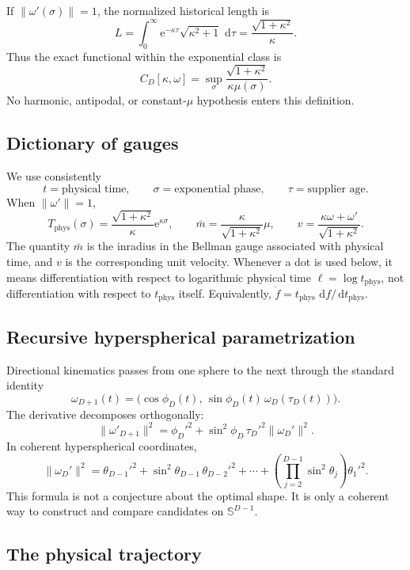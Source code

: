 \documentclass[10pt,a4paper]{article}
\newcommand{\Sph}{\mathbb{S}}
\newcommand{\dd}{\,\mathrm{d}}
\newcommand{\e}{\mathrm{e}}
\newcommand{\Tphys}{T_{\mathrm{phys}}}
\theoremstyle{plain}
\theoremstyle{definition}
\theoremstyle{remark}
\begin{document}
If $\|\omega'(\sigma)\|=1$, the normalized historical length is
\[
  L=\int_0^\infty \e^{-\kappa\tau}\sqrt{\kappa^2+1}\,\dd\tau
  =\frac{\sqrt{1+\kappa^2}}{\kappa}.
\]
Thus the exact functional within the exponential class is
\[
  C_D[\kappa,\omega]
  =\sup_\sigma\frac{\sqrt{1+\kappa^2}}{\kappa\mu(\sigma)}.
\]
No harmonic, antipodal, or constant-$\mu$ hypothesis enters this definition.

\subsection{Dictionary of gauges}

We use consistently
\[
  t=\text{physical time},
  \qquad
  \sigma=\text{exponential phase},
  \qquad
  \tau=\text{supplier age}.
\]
When $\|\omega'\|=1$,
\[
  \Tphys(\sigma)=\frac{\sqrt{1+\kappa^2}}{\kappa}\e^{\kappa\sigma},
  \qquad
  \bar m=\frac{\kappa}{\sqrt{1+\kappa^2}}\mu,
  \qquad
  v=\frac{\kappa\omega+\omega'}{\sqrt{1+\kappa^2}}.
\]
The quantity $\bar m$ is the inradius in the Bellman gauge associated with physical time, and $v$ is the corresponding unit velocity. Whenever a dot is used below, it means differentiation with respect to logarithmic physical time $\ell=\log t_{\mathrm{phys}}$, not differentiation with respect to $t_{\mathrm{phys}}$ itself. Equivalently, $\dot f=t_{\mathrm{phys}}\,\dd f/\dd t_{\mathrm{phys}}$.

\subsection{Recursive hyperspherical parametrization}

Directional kinematics passes from one sphere to the next through the standard identity
\[
  \omega_{D+1}(t)
  =\bigl(\cos\phi_D(t),\,\sin\phi_D(t)\,\omega_D(\tau_D(t))\bigr).
\]
The derivative decomposes orthogonally:
\[
  \|\omega'_{D+1}\|^2
  =\phi_D'^2+\sin^2\phi_D\,\tau_D'^2\|\omega_D'\|^2.
\]
In coherent hyperspherical coordinates,
\[
  \|\omega_D'\|^2
  =\theta_{D-1}'^2+\sin^2\theta_{D-1}\,\theta_{D-2}'^2
  +\cdots+
  \left(\prod_{j=2}^{D-1}\sin^2\theta_j\right)\theta_1'^2.
\]
This formula is not a conjecture about the optimal shape. It is only a coherent way to construct and compare candidates on $\Sph^{D-1}$.

\subsection{The physical trajectory}
\end{document}
